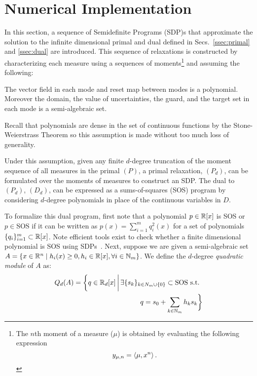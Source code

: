 \section{Numerical Implementation}
\label{sec:implementation}

In this section, a sequence of Semidefinite Programs (SDP)s that approximate the solution to the infinite dimensional primal and dual defined in Secs.~\ref{ssec:primal} and \ref{ssec:dual} are introduced.
This sequence of relaxations is constructed by characterizing each measure using a sequences of moments\footnote{The $n$th moment of a measure ($\mu$) is obtained by evaluating the following expression
  $$y_{\mu,n}=\left\langle \mu,x^n\right\rangle.$$}
and assuming the following:
\begin{assump}
The vector field in each mode and reset map between modes is a polynomial. 
Moreover the domain, the value of uncertainties, the guard, and the target set in each mode is a semi-algebraic set.
  \label{assump:poly}
\end{assump}
Recall that polynomials are dense in the set of continuous functions by the Stone-Weierstrass Theorem so this assumption is made without too much loss of generality.

Under this assumption, given any finite $d$-degree truncation of the moment sequence of all measures in the primal $(P)$, a primal relaxation, $(P_d)$, can be formulated over the moments of measures to construct an SDP. 
The dual to $(P_d)$, $(D_d)$, can be expressed as a sums-of-squares (SOS) program by considering $d$-degree polynomials in place of the continuous variables in $D$.

To formalize this dual program, first note that a polynomial $p \in \mathbb{R}[x]$ is SOS or $p \in \text{SOS}$ if it can be written as $p(x) = \sum_{i=1}^m q_i^2(x)$ for a set of polynomials $\{q_i\}_{i=1}^m \subset \mathbb{R}[x]$.
Note efficient tools exist to check whether a finite dimensional polynomial is SOS using SDPs~\cite{parrilo2000structured}.
Next, suppose we are given a semi-algebraic set $A = \{x \in \mathbb{R}^n \mid h_{i}(x) \geq 0, h_i \in \mathbb{R}[x], \forall i \in \mathbb{N}_m \}$.
We define the $d$-degree {\em quadratic module} of $A$ as:
\begin{align}
  \begin{split}
  Q_d(A)=\bigg\{q\in \mathbb{R}_d[x]\,\bigg|\, \exists \{s_k\}_{k \in N_m \cup \{0\}} \subset \text{SOS s.t. } \\ q=s_0+\sum_{k\in \mathbb{N}_{m}}h_{k}s_k \bigg\}
  \end{split}
\end{align}


